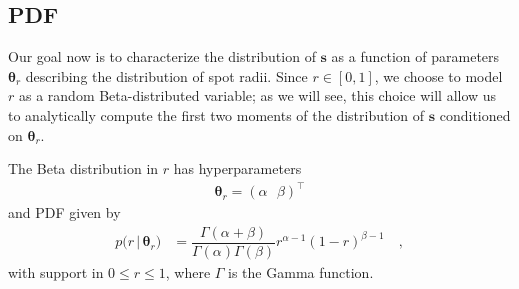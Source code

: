 \documentclass[modern]{aastex62}
\begin{document}

\subsection{PDF}
\label{sec:size-pdf}
%
Our goal now is to characterize the distribution of $\mathbf{s}$ as a
function of parameters $\pmb{\theta}_r$ describing the distribution of
spot radii. Since $r \in [0, 1]$, we choose to model $r$ as a random
Beta-distributed variable; as we will see, this choice will allow us to
analytically compute the first two moments of the distribution of
$\mathbf{s}$ conditioned on $\pmb{\theta}_r$.

%
The Beta distribution in $r$ has hyperparameters
%
\begin{align}
    \pmb{\theta}_r = \left(
    \alpha \, \, \, \,
    \beta \right)^\top
\end{align}
%
and PDF given by
%
\begin{align}
    \label{eq:pdf_r}
    p \big(r \, \big| \, \pmb{\theta}_r \big)
     & =
    \dfrac{\Gamma(\alpha + \beta)}{\Gamma(\alpha)\Gamma(\beta)}
    r^{\alpha - 1}
    (1 - r)^{\beta - 1}
    \quad,
\end{align}
%
with support in $0 \leq r \leq 1$,
where $\Gamma$ is the Gamma function.
\end{document}

